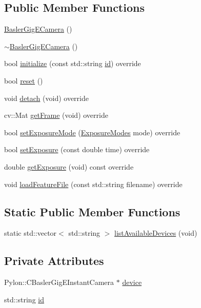 \subsection*{Public Member Functions}
\begin{DoxyCompactItemize}
\item 
\hyperlink{class_basler_gig_e_camera_a4e73954bf129084f8ad3aae41eb07ed5}{Basler\+Gig\+E\+Camera} ()
\item 
\hyperlink{class_basler_gig_e_camera_a0dbeed22c6adda8a9a9e7172a1a3f7ea}{$\sim$\+Basler\+Gig\+E\+Camera} ()
\item 
bool \hyperlink{class_basler_gig_e_camera_a1690e409075c423eec92a039781989df}{initialize} (const std\+::string \hyperlink{class_basler_gig_e_camera_a1f2a44906ddb75d4fa3b0d37bc6a131e}{id}) override
\item 
bool \hyperlink{class_basler_gig_e_camera_ad1f9154be71d1dba2e456fc404198774}{reset} ()
\item 
void \hyperlink{class_basler_gig_e_camera_a13a51a76116cccbd537725457d83254f}{detach} (void) override
\item 
cv\+::\+Mat \hyperlink{class_basler_gig_e_camera_a8e2789aa27a9b0a8075457223afa415e}{get\+Frame} (void) override
\item 
bool \hyperlink{class_basler_gig_e_camera_a228061fb068600be59b4e83c0e8a8e50}{set\+Exposure\+Mode} (\hyperlink{constants_8h_a6e920987695b1da6e2df4e41dc867e18}{Exposure\+Modes} mode) override
\item 
bool \hyperlink{class_basler_gig_e_camera_a99f9cd699aac5cb1025cb7086fbba7c0}{set\+Exposure} (const double time) override
\item 
double \hyperlink{class_basler_gig_e_camera_a5f7897cae5155958ecaa8b2b9196e4e6}{get\+Exposure} (void) const override
\item 
void \hyperlink{class_basler_gig_e_camera_aa7e8cde9ecc7b2375146f41a6e35840e}{load\+Feature\+File} (const std\+::string filename) override
\end{DoxyCompactItemize}
\subsection*{Static Public Member Functions}
\begin{DoxyCompactItemize}
\item 
static std\+::vector$<$ std\+::string $>$ \hyperlink{class_basler_gig_e_camera_ad5460ff8176dd5ad111d5b9d11753ab0}{list\+Available\+Devices} (void)
\end{DoxyCompactItemize}
\subsection*{Private Attributes}
\begin{DoxyCompactItemize}
\item 
Pylon\+::\+C\+Basler\+Gig\+E\+Instant\+Camera $\ast$ \hyperlink{class_basler_gig_e_camera_a1168e69fb72a76385e2628e6dfc3472c}{device}
\item 
std\+::string \hyperlink{class_basler_gig_e_camera_a1f2a44906ddb75d4fa3b0d37bc6a131e}{id}
\end{DoxyCompactItemize}
